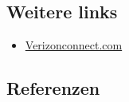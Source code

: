 \documentclass[
]{book}
\providecommand{\tightlist}{%
  \setlength{\itemsep}{0pt}\setlength{\parskip}{0pt}}
\begin{document}
\hypertarget{weitere-links-11}{%
\subsection*{Weitere links}\label{weitere-links-11}}

\begin{itemize}
\tightlist
\item
  \href{https://www.verizonconnect.com/at/industrie/vertriebsroutenplaner/}{Verizonconnect.com}
\end{itemize}

\hypertarget{referenzen-13}{%
\subsection*{Referenzen}\label{referenzen-13}}
\end{document}
